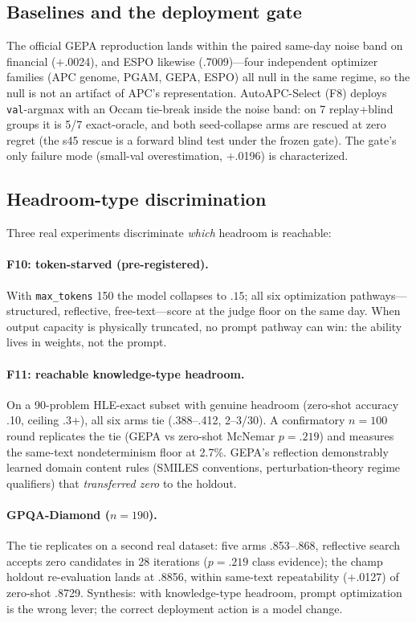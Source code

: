 \documentclass[11pt]{article}
\newcommand{\zs}{zero-shot}
\begin{document}
\subsection{Baselines and the deployment gate}
\label{sec:baselines}

The official GEPA reproduction lands within the paired same-day noise band on financial ($+$.0024), and ESPO likewise (.7009)---four independent optimizer families (APC genome, PGAM, GEPA, ESPO) all null in the same regime, so the null is not an artifact of APC's representation. AutoAPC-Select (F8) deploys \texttt{val}-argmax with an Occam tie-break inside the noise band: on 7 replay+blind groups it is 5/7 exact-oracle, and both seed-collapse arms are rescued at zero regret (the s45 rescue is a forward blind test under the frozen gate). The gate's only failure mode (small-val overestimation, $+$.0196) is characterized.

\subsection{Headroom-type discrimination}
\label{sec:taxonomy}

Three real experiments discriminate \emph{which} headroom is reachable:

\paragraph{F10: token-starved (pre-registered).} With \texttt{max\_tokens} 150 the model collapses to $.15$; all six optimization pathways---structured, reflective, free-text---score at the judge floor on the same day. When output capacity is physically truncated, no prompt pathway can win: the ability lives in weights, not the prompt.

\paragraph{F11: reachable knowledge-type headroom.} On a 90-problem HLE-exact subset with genuine headroom (\zs{} accuracy .10, ceiling .3+), all six arms tie (.388--.412, 2--3/30). A confirmatory $n{=}100$ round replicates the tie (GEPA vs \zs{} McNemar $p{=}.219$) and measures the same-text nondeterminism floor at 2.7\%. GEPA's reflection demonstrably learned domain content rules (SMILES conventions, perturbation-theory regime qualifiers) that \emph{transferred zero} to the holdout.

\paragraph{GPQA-Diamond ($n{=}190$).} The tie replicates on a second real dataset: five arms .853--.868, reflective search accepts zero candidates in 28 iterations ($p{=}.219$ class evidence); the champ holdout re-evaluation lands at .8856, within same-text repeatability ($+$.0127) of \zs{} .8729. Synthesis: with knowledge-type headroom, prompt optimization is the wrong lever; the correct deployment action is a model change.
\end{document}
